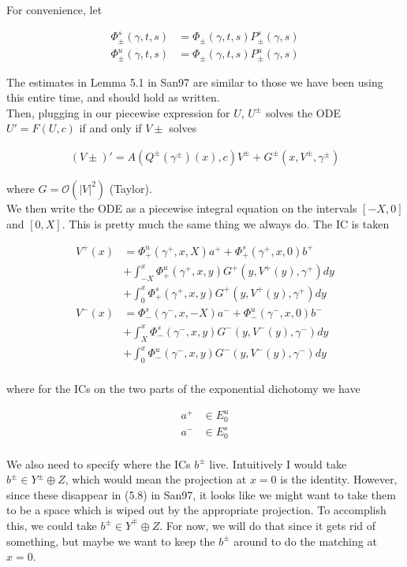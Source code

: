 \documentclass[12pt]{article}
\begin{document}
For convenience, let

\begin{align*}
\Phi^s_\pm(\gamma, t, s) &= \Phi_\pm(\gamma, t, s) P^s_\pm(\gamma, s) \\
\Phi^u_\pm(\gamma, t, s) &= \Phi_\pm(\gamma, t, s) P^u_\pm(\gamma, s) 
\end{align*}

The estimates in Lemma 5.1 in San97 are similar to those we have been using this entire time, and should hold as written.\\

Then, plugging in our piecewise expression for $U$, $U^\pm$ solves the ODE $U' = F(U, c)$ if and only if $V\pm$ solves

\begin{align*}
(V\pm)' = A(Q^\pm(\gamma^\pm)(x), c)V^\pm + G^\pm(x, V^\pm, \gamma^\pm) 
\end{align*}

where $G = \mathcal{O}(|V|^2)$ (Taylor).\\

We then write the ODE as a piecewise integral equation on the intervals $[-X, 0]$ and $[0, X]$. This is pretty much the same thing we always do. The IC is taken 

\begin{align*}
V^+(x) &= \Phi^u_+(\gamma^+, x, X) a^+ + \Phi^s_+(\gamma^+, x, 0) b^+ \\
&+ \int_{-X}^x \Phi_+^u(\gamma^+, x, y) G^+(y, V^+(y),\gamma^+)dy \\
&+ \int_0^x \Phi_+^s(\gamma^+, x, y) G^+(y, V^+(y),\gamma^+)dy \\ 
V^-(x) &= \Phi^s_-(\gamma^-, x, -X) a^- + \Phi^u_-(\gamma^-, x, 0) b^- \\
&+ \int_X^x \Phi_-^s(\gamma^-, x, y) G^-(y, V^-(y),\gamma^-)dy \\
&+ \int_0^x \Phi_-^u(\gamma^-, x, y) G^-(y, V^-(y),\gamma^-)dy \\
\end{align*}

where for the ICs on the two parts of the exponential dichotomy we have

\begin{align*}
a^+ &\in E_0^u \\
a^- &\in E_0^s \\
\end{align*}

We also need to specify where the ICs $b^\pm$ live. Intuitively I would take $b^\pm \in Y^\pm \oplus Z$, which would mean the projection at $x = 0$ is the identity. However, since these disappear in (5.8) in San97, it looks like we might want to take them to be a space which is wiped out by the appropriate projection. To accomplish this, we could take $b^\pm \in Y^\mp \oplus Z$. For now, we will do that since it gets rid of something, but maybe we want to keep the $b^\pm$ around to do the matching at $x = 0$.\\
\end{document}

